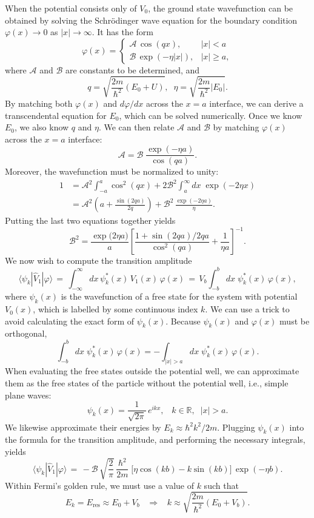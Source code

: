 \documentclass[pra,12pt]{revtex4}
\begin{document}
When the potential consists only of $V_0$, the ground state
wavefunction can be obtained by solving the Schr\"odinger wave
equation for the boundary condition $\varphi(x) \rightarrow 0$ as
$|x|\rightarrow\infty$.  It has the form
$$\varphi(x) = \begin{cases}\mathcal{A}\,\cos(qx), & |x| < a \\
\mathcal{B} \, \exp\left(-\eta|x|\right), & |x| \ge a,\end{cases}$$
where $\mathcal{A}$ and $\mathcal{B}$ are constants to be determined,
and
$$q = \sqrt{\frac{2m}{\hbar^2}(E_0+U)}, \;\; \eta = \sqrt{\frac{2m}{\hbar^2}|E_0|}.$$
By matching both $\varphi(x)$ and $d\varphi/dx$ across the $x=a$
interface, we can derive a transcendental equation for $E_0$, which
can be solved numerically.  Once we know $E_0$, we also know $q$ and
$\eta$.  We can then relate $\mathcal{A}$ and $\mathcal{B}$ by
matching $\varphi(x)$ across the $x=a$ interface:
$$\mathcal{A} = \mathcal{B}\; \frac{\exp(-\eta a)}{\cos(qa)}.$$
Moreover, the wavefunction must be normalized to unity:
$$\begin{aligned}1 &= \mathcal{A}^2 \int_{-a}^a \cos^2(qx) + 2\mathcal{B}^2 \int_a^\infty dx\; \exp(-2\eta x) \\ &= \mathcal{A}^2 \left(a+\frac{\sin(2qa)}{2q}\right) + \mathcal{B}^2\, \frac{\exp(-2\eta a)}{\eta}.\end{aligned}$$
Putting the last two equations together yields
$$\mathcal{B}^2 = \frac{\exp\big(2\eta a\big)}{a} \left[\frac{1+\sin(2qa)/2qa}{\cos^2(qa)}+\frac{1}{\eta a}\right]^{-1}.$$
We now wish to compute the transition amplitude
$$\langle\psi_k|\hat{V}_1|\varphi\rangle \,=\, \int_{-\infty}^\infty dx \, \psi_k^*(x)\, V_1(x)\, \varphi(x) \,=\, V_b \int_{-b}^b dx \; \psi_k^*(x) \,\varphi(x),$$
where $\psi_k(x)$ is the wavefunction of a free state for the system
with potential $V_0(x)$, which is labelled by some continuous index
$k$.  We can use a trick to avoid calculating the exact form of
$\psi_k(x)$.  Because $\psi_k(x)$ and $\varphi(x)$ must be orthogonal,
$$\int_{-b}^b dx \; \psi_k^*(x) \,\varphi(x) = - \int_{|x| > a} dx \; \psi_k^*(x) \,\varphi(x).$$
When evaluating the free states outside the potential well, we can
approximate them as the free states of the particle without the
potential well, i.e., simple plane waves:
$$\psi_k(x) = \frac{1}{\sqrt{2\pi}}\, e^{ikx}, \;\;\;k\in\mathbb{R}, \;\;|x|>a.$$
We likewise approximate their energies by $E_k \approx \hbar^2k^2/2m$.
Plugging $\psi_k(x)$ into the formula for the transition amplitude,
and performing the necessary integrals, yields
$$\langle\psi_k|\hat{V}_1|\varphi\rangle \,=\, - \mathcal{B} \, \sqrt{\frac{2}{\pi}} \, \frac{\hbar^2}{2m} \; \big[\eta\cos(kb) - k\sin(kb)\big] \, \exp(-\eta b).$$
Within Fermi's golden rule, we must use a value of $k$ such that
$$E_k = E_{\mathrm{res}} \approx E_0 + V_b \;\;\;\Rightarrow \;\;\; k \approx \sqrt{\frac{2m}{\hbar^2}(E_0+V_b)}.$$
\end{document}
